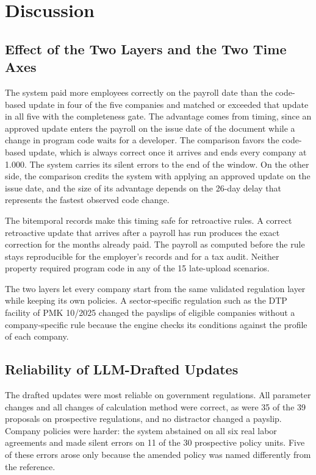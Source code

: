\section{Discussion}
\label{sec:discussion}
\subsection{Effect of the Two Layers and the Two Time Axes}
The system paid more employees correctly on the payroll date than the code-based update in four of the five companies and matched or exceeded that update in all five with the completeness gate. The advantage comes from timing, since an approved update enters the payroll on the issue date of the document while a change in program code waits for a developer. The comparison favors the code-based update, which is always correct once it arrives and ends every company at 1.000. The system carries its silent errors to the end of the window. On the other side, the comparison credits the system with applying an approved update on the issue date, and the size of its advantage depends on the 26-day delay that represents the fastest observed code change.

The bitemporal records make this timing safe for retroactive rules. A correct retroactive update that arrives after a payroll has run produces the exact correction for the months already paid. The payroll as computed before the rule stays reproducible for the employer's records and for a tax audit. Neither property required program code in any of the 15 late-upload scenarios.

The two layers let every company start from the same validated regulation layer while keeping its own policies. A sector-specific regulation such as the DTP facility of PMK 10/2025 changed the payslips of eligible companies without a company-specific rule because the engine checks its conditions against the profile of each company.

\subsection{Reliability of LLM-Drafted Updates}
The drafted updates were most reliable on government regulations. All parameter changes and all changes of calculation method were correct, as were 35 of the 39 proposals on prospective regulations, and no distractor changed a payslip. Company policies were harder: the system abstained on all six real labor agreements and made silent errors on 11 of the 30 prospective policy units. Five of these errors arose only because the amended policy was named differently from the reference.

